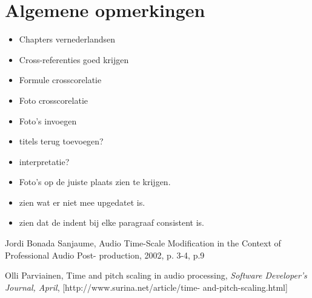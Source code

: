 \documentclass[12pt]{report}
\begin{document}
\section{Algemene opmerkingen}
\begin{itemize}
\item Chapters vernederlandsen
\item Cross-referenties goed krijgen
\item Formule crosscorelatie
\item Foto crosscorelatie
\item Foto's invoegen
\item titels terug toevoegen?
\item interpretatie?
\item Foto's op de juiste plaats zien te krijgen.
\item zien wat er niet mee upgedatet is.
\item zien dat de indent bij elke paragraaf consistent is.

\end{itemize}



\begin{thebibliography}{2} %
	Jordi Bonada Sanjaume,
	Audio Time-Scale Modification in the 	Context of Professional Audio Post-			production,
	2002,
	p. 3-4, p.9
	
	Olli Parviainen,
	Time and pitch scaling in audio processing,
	\emph{Software Developer's Journal, April},
	[http://www.surina.net/article/time-		and-pitch-scaling.html]
	
		
\end{thebibliography}
\end{document}

